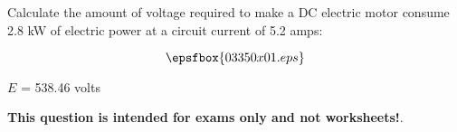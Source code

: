 

Calculate the amount of voltage required to make a DC electric motor consume 2.8 kW of electric power at a circuit current of 5.2 amps:

$$\epsfbox{03350x01.eps}$$







$E$ = 538.46 volts







{\bf This question is intended for exams only and not worksheets!}.



